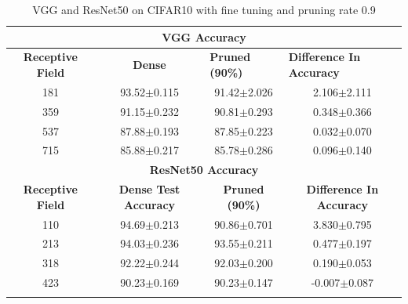 \begin{table}[H]
  \centering
\begin{tabular}{@{}cccc@{}}
\toprule
\multicolumn{4}{c}{\textbf{VGG  Accuracy}}                                                                                                                                  \\ \midrule
\textbf{Receptive Field} & \textbf{Dense} & \multicolumn{1}{l}{\textbf{Pruned (90\%)}} & \multicolumn{1}{l}{\textbf{Difference In Accuracy}} \\ \midrule
181                      & 93.52$\pm$0.115              & 91.42$\pm$2.026                                   & 2.106$\pm$2.111                                     \\
359                      & 91.15$\pm$0.232              & 90.81$\pm$0.293                                   & 0.348$\pm$0.366                                     \\
537                      & 87.88$\pm$0.193              & 87.85$\pm$0.223                                   & 0.032$\pm$0.070                                     \\
715                      & 85.88$\pm$0.217              & 85.78$\pm$0.286                                   & 0.096$\pm$0.140                                     \\ \midrule
\multicolumn{4}{c}{\textbf{ResNet50 Accuracy}}                                                                                                                             \\ \midrule
\textbf{Receptive Field} & \textbf{Dense Test Accuracy} & \textbf{Pruned (90\%)}                     & \textbf{Difference In Accuracy}                     \\
110                      & 94.69$\pm$0.213              & 90.86$\pm$0.701                                   & 3.830$\pm$0.795                                     \\
213                      & 94.03$\pm$0.236              & 93.55$\pm$0.211                                   & 0.477$\pm$0.197                                     \\
318                      & 92.22$\pm$0.244              & 92.03$\pm$0.200                                   & 0.190$\pm$0.053                                     \\
423                      & 90.23$\pm$0.169              & 90.23$\pm$0.147                                   &
-0.007$\pm$0.087                                    \\ \bottomrule\\
\end{tabular}
\caption{VGG and ResNet50 on CIFAR10 with fine tuning and pruning rate 0.9}
\label{tab:cifar10 fine tuning pruning rate 09}
\end{table}


